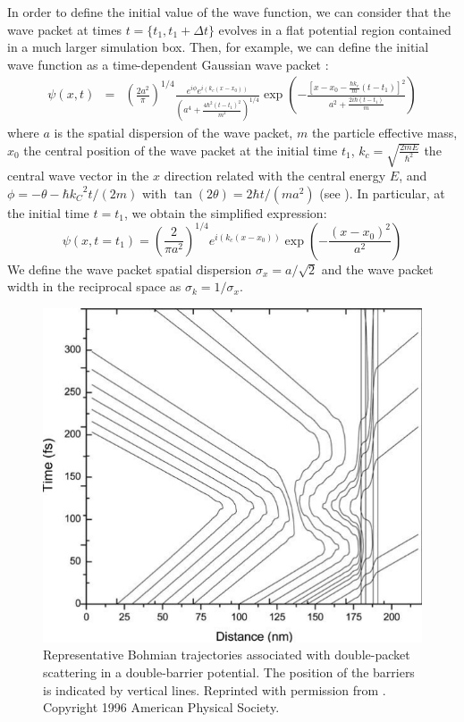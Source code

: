 \documentclass[onecolumn,nofootinbib, secnumarabic, amsmath, nobibnotes,12pt,aps,pra]{revtex4-1}
\begin{document}
In order to define the initial value of the wave function, we can consider that the wave packet at times $t = \{t_1,t_1 + \Delta t\}$ evolves in a flat potential region contained in a much larger simulation box. Then, for example, we can define the  initial wave function as a time-dependent Gaussian wave packet \cite{om.cohen}:
\begin{eqnarray}
\psi (x,t) &=& {{\left( \frac{2{{a}^{2}}}{\pi } \right)}^{1/4}}\frac{{{e}^{i\phi }}{e}^{i(k_c(x-x_0))}}{{{\left( {{a}^{4}} + \frac{4{{\hbar }^{2}}{{(t-{{t}_{1}})}^{2}}}{{{m}^{2}}} \right)}^{1/4}}}\exp \left(-\frac{{{\left[x - {{x}_0} - \frac{\hbar {{k}_{c}}}{m}(t - {{t}_{1}}) \right]}^{2}}}{{{a}^{2}} + \frac{2i\hbar (t - {{t}_{1}})}{m}} \right)
\label{om.finite-difference_innitial}
\end{eqnarray}
where $a$ is the spatial dispersion of the wave packet, $m$ the particle effective mass, $x_0$ the central position of the wave packet at the initial time $t_1$, ${k}_{c} = \sqrt{\frac{2mE}{{\hbar }^{2}}}$ the central wave vector in the $x$ direction related with the central energy $E$, and $\phi = -\theta - {\hbar {k_C}^{2}t}/{(2m)}$ with $\tan (2 \theta ) = {2 \hbar t}/{(m{{a}^{2}})}$ (see \cite{om.cohen}). In particular, at the initial time $t = t_1$, we obtain the simplified expression:
\begin{equation}
\psi (x,t = t_1) = {{\left( \frac{2}{\pi {{a}^{2}}} \right)}^{1/4}}{{e}^{i\left( {{k}_{c}}(x-{{x}_0}) \right)}} \exp \left( -\frac{{{(x-{{x}_0})}^{2}}}{{{a}^{2}}} \right)
\end{equation}
We define the wave packet spatial dispersion ${{\sigma }_{x}} =
a/\sqrt{2}$ and the wave packet width in the reciprocal  space as
${{\sigma }_{k}} = 1/{{\sigma }_{x}}$.


\begin{figure}
\includegraphics{ch1-A1.pdf}
\caption{Representative Bohmian trajectories associated with double-packet scattering in a double-barrier potential. The position of the barriers is indicated by vertical lines. Reprinted with permission from \cite{om.oriolstime}. Copyright 1996 American Physical Society.}
\label{om_fig_twopaq1}
\end{figure}
\end{document}
